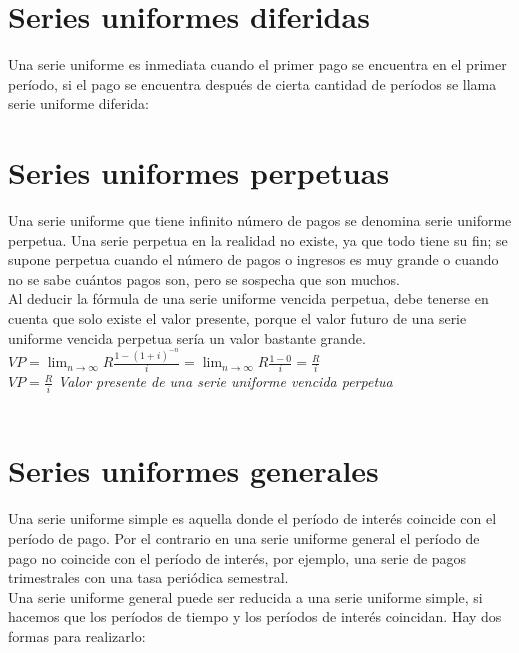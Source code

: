 \section{Series uniformes diferidas}
Una serie uniforme es inmediata cuando el primer pago se encuentra en el primer período, si el pago se encuentra después de cierta cantidad de períodos se llama serie uniforme diferida: \\




\section{Series uniformes perpetuas}

Una serie uniforme que tiene infinito número de pagos se denomina serie uniforme perpetua. Una serie perpetua en la realidad no existe, ya que todo tiene su fin; se supone perpetua cuando el número de pagos o ingresos es muy grande o cuando no se sabe cuántos pagos son, pero se sospecha que son muchos.\\

Al deducir la fórmula de una serie uniforme vencida perpetua, debe tenerse en cuenta que solo existe el valor presente, porque el valor futuro de una serie uniforme vencida perpetua sería un valor bastante grande.\\

$ VP = \lim_{n\to \infty}R\frac{1-(1+i)^{-n}}{i} = \lim_{n\to \infty} R\frac{1-0}{i} = \frac{R}{i}$\\

$ VP = \frac{R}{i}$ \hspace{35pt}\textit{Valor presente de una serie uniforme vencida perpetua}\\ \\




\section{Series uniformes generales}

Una serie uniforme simple es aquella donde el período de interés coincide con el período de pago. Por el contrario en una serie uniforme general el período de pago no coincide con el período de interés, por ejemplo, una serie de pagos trimestrales con una tasa periódica semestral.\\

Una serie uniforme general puede ser reducida a una serie uniforme simple, si hacemos que los períodos de tiempo y los períodos de interés coincidan. Hay dos formas para realizarlo:\\

